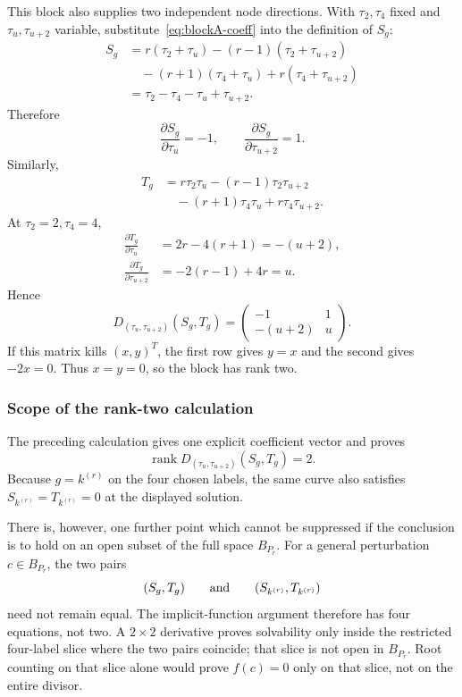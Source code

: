 \documentclass[11pt]{article}
\theoremstyle{definition}
\newcommand{\rank}{\operatorname{rank}}
\begin{document}
This block also supplies two independent node directions.  With $\tau_2,\tau_4$ fixed and $\tau_u,\tau_{u+2}$ variable, substitute~\eqref{eq:blockA-coeff} into the definition of $S_g$:
\begin{align*}
S_g
&=r(\tau_2+\tau_u)
-(r-1)(\tau_2+\tau_{u+2})\\
&\quad -(r+1)(\tau_4+\tau_u)
+r(\tau_4+\tau_{u+2})\\
&=\tau_2-\tau_4-\tau_u+\tau_{u+2}.
\end{align*}
Therefore
\begin{equation}
\frac{\partial S_g}{\partial\tau_u}=-1,
\qquad
\frac{\partial S_g}{\partial\tau_{u+2}}=1.
\label{eq:A-S-derivative}
\end{equation}
Similarly,
\begin{align*}
T_g
&=r\tau_2\tau_u
-(r-1)\tau_2\tau_{u+2}\\
&\quad -(r+1)\tau_4\tau_u
+r\tau_4\tau_{u+2}.
\end{align*}
At $\tau_2=2,\tau_4=4$,
\begin{align}
\frac{\partial T_g}{\partial\tau_u}
&=2r-4(r+1)=-(u+2),\label{eq:A-Tdu}\\
\frac{\partial T_g}{\partial\tau_{u+2}}
&=-2(r-1)+4r=u.\label{eq:A-Tdv}
\end{align}
Hence
\begin{equation}
D_{(\tau_u,\tau_{u+2})}(S_g,T_g)
=
\begin{pmatrix}
-1&1\\
-(u+2)&u
\end{pmatrix}.
\label{eq:A-J}
\end{equation}
If this matrix kills $(x,y)^T$, the first row gives $y=x$ and the second gives $-2x=0$.  Thus $x=y=0$, so the block has rank two.

\subsubsection{Scope of the rank-two calculation}

The preceding calculation gives one explicit coefficient vector and proves
\[
\rank D_{(\tau_u,\tau_{u+2})}(S_g,T_g)=2.
\]
Because $g=k^{(r)}$ on the four chosen labels, the same curve also satisfies
$S_{k^{(r)}}=T_{k^{(r)}}=0$ at the displayed solution.

There is, however, one further point which cannot be suppressed if the
conclusion is to hold on an open subset of the full space $B_{P_r}$.  For a
general perturbation $c\in B_{P_r}$, the two pairs
\[
(S_g,T_g)
\qquad\hbox{and}\qquad
(S_{k^{(r)}},T_{k^{(r)}})
\]
need not remain equal.  The implicit-function argument therefore has four
equations, not two.  A $2\times2$ derivative proves solvability only inside
the restricted four-label slice where the two pairs coincide; that slice is
not open in $B_{P_r}$.  Root counting on that slice alone would prove
$f(c)=0$ only on that slice, not on the entire divisor.
\end{document}
